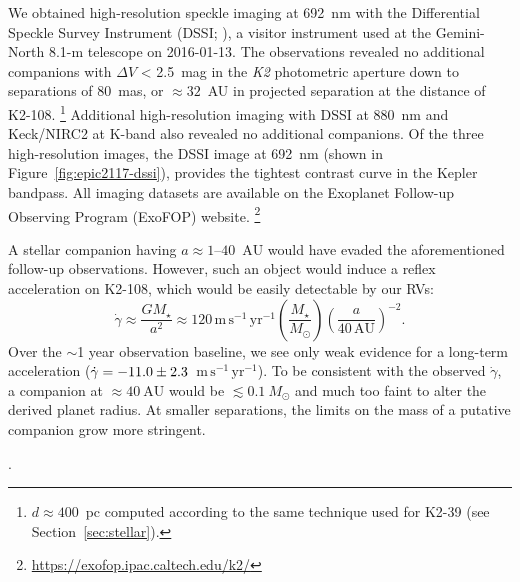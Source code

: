 \documentclass[preprint2]{aastex6}
\newcommand{\ktwo}{\textit{K2}\xspace}
\newcommand{\Mstar}{\ensuremath{M_{\star}}\xspace}
\newcommand{\msyr}{\ensuremath{\mathrm{m}\,\mathrm{s}^{-1}\,\mathrm{yr}^{-1}}\xspace}
\newcommand{\AU}{\ensuremath{\mathrm{AU}}\xspace}
\newcommand{\Msun}{\ensuremath{M_{\odot}}\xspace}
\newcommand{\dvdt}{\ensuremath{\dot{\gamma}}\xspace}
\begin{document}
We obtained high-resolution speckle imaging at 692~nm with the Differential Speckle Survey Instrument (DSSI; \citealt{Horch12}), a visitor instrument used at the Gemini-North 8.1-m  telescope on 2016-01-13. The observations revealed no additional companions with $\Delta V$ < 2.5~mag in the \ktwo photometric aperture down to separations of 80~mas, or $\approx32$~AU in projected separation at the distance of K2-108.%
\footnote{
$d \approx 400$~pc computed according to the same technique used for K2-39 (see Section~\ref{sec:stellar}).  
}
Additional high-resolution imaging with DSSI at 880~nm and Keck/NIRC2 at K-band also revealed no additional companions. Of the three high-resolution images, the DSSI image at 692~nm (shown in Figure~\ref{fig:epic2117-dssi}), provides the tightest contrast curve in the Kepler bandpass. All imaging datasets are available on the Exoplanet Follow-up Observing Program (ExoFOP) website.%
\footnote{\url{https://exofop.ipac.caltech.edu/k2/}}

A stellar companion having $a \approx 1$--$40$~\AU would have evaded the aforementioned follow-up observations. However, such an object would induce a reflex acceleration on K2-108, which would be easily detectable by our RVs:
\[
\dvdt \approx \frac{G \Mstar}{a^2} \approx 120\, \msyr \left(\frac{\Mstar}{\Msun}\right) \left(\frac{a}{40\, \AU}\right)^{-2}.
\]
Over the $\sim$1 year observation baseline, we see only weak evidence for a long-term acceleration ($\dvdt = \val{epic2117-ecc}{dvdt}$~\msyr). To be consistent with the observed \dvdt, a companion at $\approx40~\AU$ would be $\lesssim 0.1~\Msun$ and much too faint to alter the derived planet radius. At smaller separations, the limits on the mass of a putative companion grow more stringent.

\begin{figure*}
\caption{Top: \ktwo light curve of K2-108 showing with the transits of K2-108b labeled with red ticks. Bottom: photometry phase-folded on the transit ephemeris.\label{fig:epic2117-lightcurve}}
\end{figure*}

\begin{figure*}
\caption{Single Keplerian model to the K2-108 radial velocities (RVs), allowing for eccentricity (see Section~\ref{ssec:epic2117}). {\bf a)} Time series of RVs from HIRES. The blue line shows the most probable Keplerian model. {\bf b)} Residuals to the most probable Keplerian model. {\bf c)} The phase-folded RVs and the most probable Keplerian model.\label{fig:epic2117}}.
\end{figure*}
\end{document}
